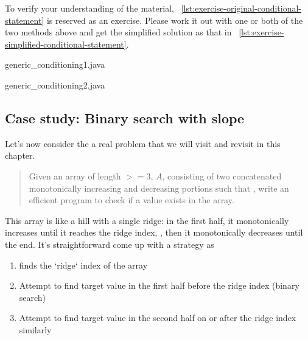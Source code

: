 To verify your understanding of the material,
~\autoref{lst:exercise-original-conditional-statement} is reserved as an exercise.
Please work it out with one or both of the two methods above and get the simplified solution as
that in ~\autoref{lst:exercise-simplified-conditional-statement}.
\begin{clisting}
    \begin{minipage}[t]{.4\textwidth}
        
        {generic_conditioning1.java}
    \end{minipage}\hfill
    \begin{minipage}[t]{.4\textwidth}
        
        {generic_conditioning2.java}
    \end{minipage}
\end{clisting}

\subsection{Case study: Binary search with slope}\label{subsec:case-study:binary-search-direction}

Let's now consider the a real problem that we will visit and revisit in this chapter.
\begin{quote}
    Given an array of length $>= 3$, $A$, consisting of two concatenated monotonically increasing
    and decreasing portions such that , write an efficient program to check if a  value exists in the array.
\end{quote}

This array is like a hill with a single ridge: in the first half, it monotonically increases until
it reaches the ridge index, , then it monotonically decreases until the end.
It's straightforward come up with a strategy as
\begin{enumerate}
    \item finds the `ridge` index of the array
    \item Attempt to find target value in the first half before the ridge index (binary search)
    \item Attempt to find target value in the second half on or after the ridge index similarly
\end{enumerate}


